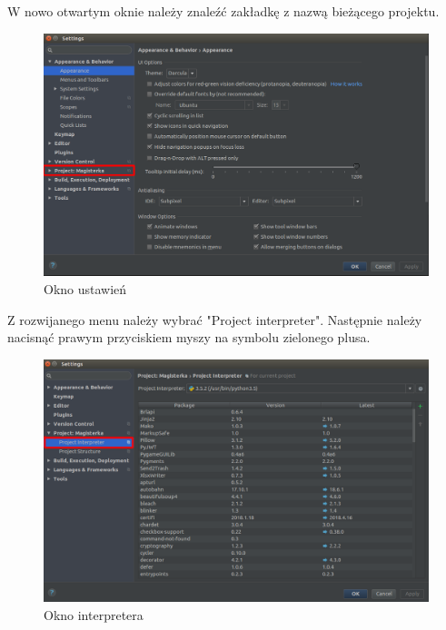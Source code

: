 W nowo otwartym oknie należy znaleźć zakładkę z nazwą bieżącego projektu.

\begin{figure}[h]
\centering
\includegraphics[width=13cm]{Zdjecia/5/kasia/settings2}
\caption{Okno ustawień}
\label{fig:file}
\end{figure}

Z rozwijanego menu należy wybrać "Project interpreter". Następnie należy nacisnąć prawym przyciskiem myszy na symbolu zielonego plusa.

\begin{figure}[h]
\centering
\includegraphics[width=13cm]{Zdjecia/5/kasia/settings3}
\caption{Okno interpretera}
\label{fig:file}
\end{figure}


